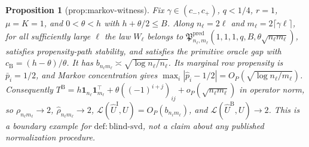 \documentclass{article}
\newtheorem{proposition}{Proposition}
\begin{document}
\begin{proposition}[prop:markov-witness]\label{prop:markov-witness}
Fix \(\gamma\in(c_-,c_+)\), \(q<1/4\), \(r=1\), \(\mu=K=1\), and \(0<\theta<h\) with \(h+\theta/2\le B\). Along \(n_\ell=2\ell\) and \(m_\ell=2\lceil\gamma\ell\rceil\), for all sufficiently large \(\ell\) the law \(W_\ell\) belongs to \(\mathfrak P^{\mathrm{pred}}_{n_\ell,m_\ell}(1,1,1,q,B,\theta\sqrt{n_\ell m_\ell})\), satisfies propensity-path stability, and satisfies the primitive oracle gap with \(c_{\mathrm B}=(h-\theta)/\theta\). It has \(b_{n_\ell m_\ell}\asymp\sqrt{\log n_\ell/n_\ell}\). Its marginal row propensity is \(\bar p_i=1/2\), and Markov concentration gives \(\max_i|\widehat p_i-1/2|=O_P(\sqrt{\log n_\ell/m_\ell})\). Consequently \(T^{\mathrm B}=h\mathbf1_{n_\ell}\mathbf1_{m_\ell}^\top+\theta((-1)^{i+j})_{ij}+o_P(\sqrt{n_\ell m_\ell})\) in operator norm, so \(\rho_{n_\ell m_\ell}\to2\), \(\widehat\rho_{n_\ell m_\ell}\to2\), \(\mathcal L(\widehat U^{\mathrm I},U)=O_P(b_{n_\ell m_\ell})\), and \(\mathcal L(\widehat U^{\mathrm B},U)\to2\). This is a boundary example for \(\mathrm{def:blind\mbox{-}svd}\), not a claim about any published normalization procedure.
\end{proposition}
\end{document}
